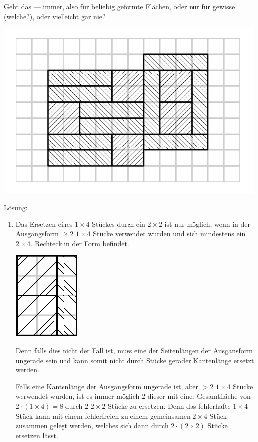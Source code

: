 \documentclass[main.tex]{subfiles}
\begin{document}
\begin{enumerate}
	      Geht das — immer, also für beliebig geformte Flächen,
	      oder nur für gewisse (welche?), oder vielleicht gar nie?
	      \begin{center}
			\includegraphics[scale=0.5]{tiles}
	      \end{center}

	      Lösung:
	      \begin{enumerate}
		      \item Das Ersetzen eines \( 1 \times 4 \) Stückes durch ein \( 2 \times 2 \) ist nur möglich, wenn in der
				Ausgangsform \( \geq 2 \) \( 1 \times 4 \) Stücke verwendet wurden und sich mindestens ein \( 2 \times 4 \).
				Rechteck in der Form befindet.
		            \begin{center}
			            \includegraphics[scale=0.5]{tiles_small}
		            \end{center}
		            Denn falls dies nicht der Fall ist, muss eine der Seitenlängen der Ausgansform ungerade sein und kann somit
		            nicht durch Stücke gerader Kantenlänge ersetzt werden.

		            Falls eine Kantenlänge der Ausgangsform ungerade ist, aber \( > 2 \) \( 1 \times 4 \) Stücke werwendet wurden,
		            ist es immer möglich \( 2 \) dieser mit einer Gesamtfläche von \( 2 \cdot (1 \times 4) = 8 \) durch \( 2 \) \( 2 \times 2  \)
		            Stücke zu ersetzen. Denn das fehlerhafte \( 1 \times 4 \) Stück kann mit einem fehlerfreien zu einem
		            gemeinsamen \( 2 \times 4 \) Stück zusammen gelegt werden,
		            welches sich dann durch \( 2 \cdot (2 \times 2) \) Stücke ersetzen lässt.
	      \end{enumerate}
\end{enumerate}
\end{document}
